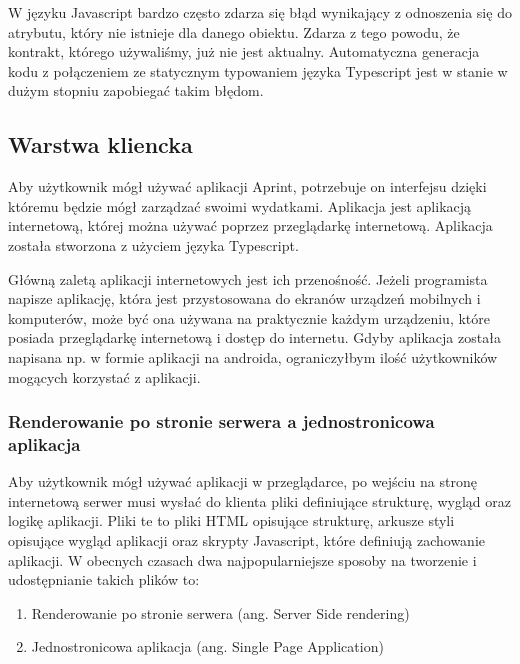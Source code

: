 W języku Javascript bardzo często zdarza się błąd wynikający z odnoszenia się do atrybutu, który nie istnieje dla danego obiektu. Zdarza z tego powodu, że kontrakt, którego używaliśmy, już nie jest aktualny. Automatyczna generacja kodu z połączeniem ze statycznym typowaniem języka Typescript jest w stanie w dużym stopniu zapobiegać takim błędom.

\subsection{Warstwa kliencka}
Aby użytkownik mógł używać aplikacji Aprint, potrzebuje on interfejsu dzięki któremu będzie mógł zarządzać swoimi wydatkami. Aplikacja jest aplikacją internetową, której można używać poprzez przeglądarkę internetową. Aplikacja została stworzona z użyciem języka Typescript.

Główną zaletą aplikacji internetowych jest ich przenośność. Jeżeli programista napisze aplikację, która jest przystosowana do ekranów urządzeń mobilnych i komputerów, może być ona używana na praktycznie każdym urządzeniu, które posiada przeglądarkę internetową i dostęp do internetu. Gdyby aplikacja została napisana np. w formie aplikacji na androida, ograniczyłbym ilość użytkowników mogących korzystać z aplikacji.
\subsubsection{Renderowanie po stronie serwera a jednostronicowa aplikacja}
Aby użytkownik mógł używać aplikacji w przeglądarce, po wejściu na stronę internetową serwer musi wysłać do klienta pliki definiujące strukturę, wygląd oraz logikę aplikacji. Pliki te to pliki HTML opisujące strukturę, arkusze styli opisujące wygląd aplikacji oraz skrypty Javascript, które definiują zachowanie aplikacji.
W obecnych czasach dwa najpopularniejsze sposoby na tworzenie i udostępnianie takich plików to:
\begin{enumerate}
  \item Renderowanie po stronie serwera (ang. Server Side rendering)
  \item Jednostronicowa aplikacja (ang. Single Page Application)
\end{enumerate}

